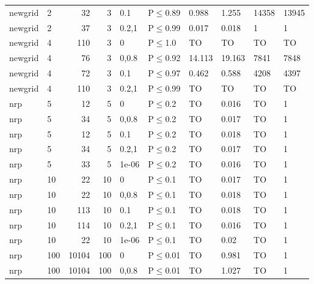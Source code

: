 \begin{longtable}{llrrllllll}
 newgrid       & 2         &     	32 &    3 & 0.1   & P$\leq$0.89  & 0.988    & 1.255    & 14358   & 13945   \\
 newgrid       & 2         &     	37 &    3 & 0.2,1 & P$\leq$0.99  & 0.017    & 0.018    & 1       & 1       \\
 newgrid       & 4         &    	110 &    3 & 0     & P$\leq$1.0   & TO       & TO       & TO      & TO      \\
 newgrid       & 4         &     	76 &    3 & 0,0.8 & P$\leq$0.92  & 14.113   & 19.163   & 7841    & 7848    \\
 newgrid       & 4         &     	72 &    3 & 0.1   & P$\leq$0.97  & 0.462    & 0.588    & 4208    & 4397    \\
 newgrid       & 4         &    	110 &    3 & 0.2,1 & P$\leq$0.99  & TO       & TO       & TO      & TO      \\
 nrp           & 5         &     	12 &    5 & 0     & P$\leq$0.2   & TO       & 0.016    & TO      & 1       \\
 nrp           & 5         &     	34 &    5 & 0,0.8 & P$\leq$0.2   & TO       & 0.017    & TO      & 1       \\
 nrp           & 5         &     	12 &    5 & 0.1   & P$\leq$0.2   & TO       & 0.018    & TO      & 1       \\
 nrp           & 5         &     	34 &    5 & 0.2,1 & P$\leq$0.2   & TO       & 0.017    & TO      & 1       \\
 nrp           & 5         &     	33 &    5 & 1e-06 & P$\leq$0.2   & TO       & 0.016    & TO      & 1       \\
 nrp           & 10        &     	22 &   10 & 0     & P$\leq$0.1   & TO       & 0.017    & TO      & 1       \\
 nrp           & 10        &     	22 &   10 & 0,0.8 & P$\leq$0.1   & TO       & 0.018    & TO      & 1       \\
 nrp           & 10        &    	113 &   10 & 0.1   & P$\leq$0.1   & TO       & 0.018    & TO      & 1       \\
 nrp           & 10        &    	114 &   10 & 0.2,1 & P$\leq$0.1   & TO       & 0.016    & TO      & 1       \\
 nrp           & 10        &     	22 &   10 & 1e-06 & P$\leq$0.1   & TO       & 0.02     & TO      & 1       \\
 nrp           & 100       &  	10104 &  100 & 0     & P$\leq$0.01  & TO       & 0.981    & TO      & 1       \\
 nrp           & 100       &  	10104 &  100 & 0,0.8 & P$\leq$0.01  & TO       & 1.027    & TO      & 1       \\

\end{longtable}
